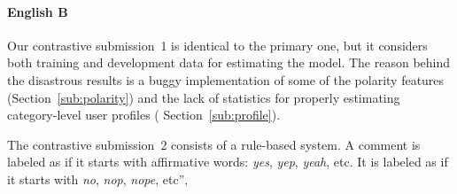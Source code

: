 \paragraph{English B}

Our contrastive submission~1 is identical to the primary one, but it considers 
both training and development data for estimating the model. The 
reason behind the disastrous results is a buggy implementation of some of 
the polarity features (\cf Section~\ref{sub:polarity}) and the lack of 
statistics for properly estimating category-level user profiles (\cf 
Section~\ref{sub:profile}). 
 
 
The contrastive submission~2 consists of a rule-based system. A comment is 
labeled as \yes if it starts with affirmative words: \textit{yes}, \textit{yep}, 
\textit{yeah}, etc.
It is labeled as \no if it starts with \textit{no}, \textit{nop}, \textit{nope}, 
etc”, 

